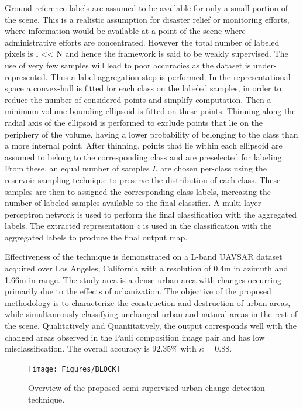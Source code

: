 \documentclass[12pt, a4paper]{article}
\begin{document}
Ground reference labels are assumed to be available for only a small portion of the scene. This is a realistic assumption for disaster relief or monitoring efforts, where information would be available at a point of the scene where administrative efforts are concentrated. However the total number of labeled pixels is l << N and hence the framework is said to be weakly supervised. The use of very few samples will lead to poor accuracies as the dataset is under-represented. Thus a label aggregation step is performed. In the representational space a convex-hull is fitted for each class on the labeled samples, in order to reduce the number of considered points and simplify computation. Then a minimum volume bounding ellipsoid is fitted on these points. Thinning along the radial axis of the ellipsoid is performed to exclude points that lie on the periphery of the volume, having a lower probability of belonging to the class than a more internal point. After thinning, points that lie within each ellipsoid are assumed to belong to the corresponding class and are preselected for labeling. From these, an equal number of samples $L$ are chosen per-class using the reservoir sampling technique to preserve the distribution of each class.  These samples are then to assigned the corresponding class labels, increasing the number of labeled samples available to the final classifier. A multi-layer perceptron network is used to perform the final classification with the aggregated labels. The extracted representation $z$ is used in the classification with the aggregated labels to produce the final output map.

Effectiveness of the technique is demonstrated on a L-band UAVSAR dataset acquired over Los Angeles, California with a resolution of 0.4m in azimuth and 1.66m in range. The study-area is a dense urban
area with changes occurring primarily due to the effects of urbanization. The objective of the proposed methodology is to characterize the construction and destruction of urban areas, while simultaneously classifying unchanged urban and natural areas in the rest of the scene. Qualitatively and Quantitatively, the output corresponds well with the changed areas observed in the Pauli composition image pair and has low misclassification. The overall accuracy is $92.35\%$ with $\kappa=0.88$. 



\begin{figure}
\centering
\texttt{[image: Figures/BLOCK]}
\caption{Overview of the proposed semi-supervised urban change detection technique.}
\label{fig:1}
\end{figure}
\end{document}
